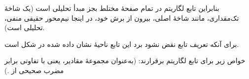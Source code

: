 \EMhold


\begin{EMunit}


\end{EMunit}

\begin{EMunit}

بنابراین تابع لگاریتم در تمام صفحهٔ مختلط بجز مبدأ تحلیلی است (یک شاخهٔ تک‌مقداری، مانند شاخهٔ اصلی، بیرون از برش خود، در اینجا نیم‌محور حقیقی منفی، تحلیلی است).



\end{EMunit}

\begin{EMunit}

برای آنکه تعریف تابع نقض نشود برد این تابع ناحیهٔ نشان داده شده در شکل است.


\end{EMunit}

خواص زیر برای تابع لگاریتم برقرارند:
(به‌عنوان مجموعهٔ مقادیر، یعنی با تفاوتی برابر مضرب صحیحی از .)
